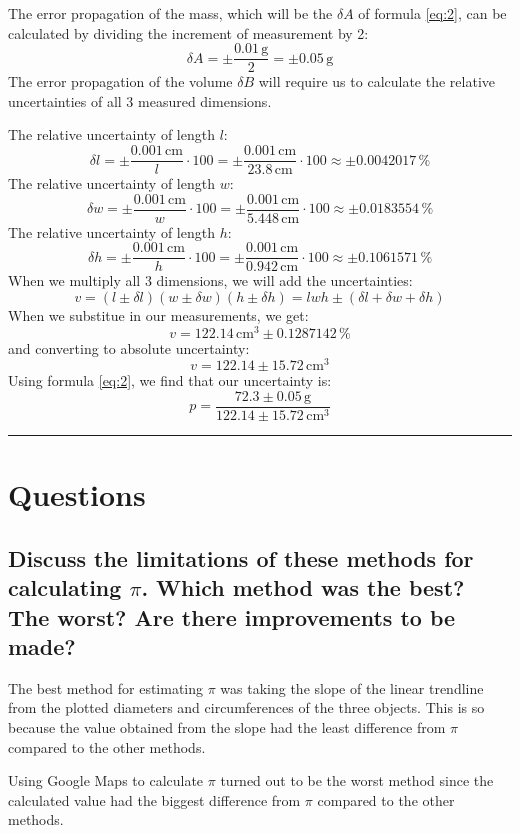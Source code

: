 \documentclass{article}
\begin{document}
The error propagation of the mass, which will be the $\delta A$ of formula \eqref{eq:2}, 
can be calculated by dividing the increment of measurement by 2:
\[ \delta A = \pm\frac{0.01\,\mathrm{g}}{2} = \pm0.05\,\mathrm{g} \]
The error propagation of the volume $\delta B$ will require us to calculate the relative uncertainties
of all 3 measured dimensions. 

\noindent The relative uncertainty of length $l$:
\[ \delta l = \pm\frac{0.001 \,\mathrm{cm}}{l} \cdot 100 = \pm\frac{0.001 \,\mathrm{cm}}{23.8 \,\mathrm{cm}} \cdot 100 \approx \pm0.0042017\,\% \]
The relative uncertainty of length $w$:
\[ \delta w = \pm\frac{0.001 \,\mathrm{cm}}{w} \cdot 100 = \pm\frac{0.001 \,\mathrm{cm}}{5.448 \,\mathrm{cm}} \cdot 100 \approx \pm0.0183554\,\% \]
The relative uncertainty of length $h$:
\[ \delta h = \pm\frac{0.001 \,\mathrm{cm}}{h} \cdot 100 = \pm\frac{0.001 \,\mathrm{cm}}{0.942 \,\mathrm{cm}} \cdot 100 \approx \pm0.1061571\,\% \]
When we multiply all 3 dimensions, we will add the uncertainties:
\[ v = (l\pm\delta l)(w\pm\delta w)(h\pm\delta h) = lwh\pm(\delta l + \delta w + \delta h) \]
When we substitue in our measurements, we get:
\[ v = 122.14 \,\mathrm{cm}^3 \pm 0.1287142\,\% \]
and converting to absolute uncertainty:
\[ v = 122.14 \pm 15.72 \,\mathrm{cm}^3 \]
Using formula \eqref{eq:2}, we find that our uncertainty is:
\[ p = \frac{72.3\pm0.05\,\mathrm{g}}{122.14\pm15.72\,\mathrm{cm}^3}\]

\vspace{1em}
\hrule

\section{Questions}
\subsection{Discuss the limitations of these 
methods for calculating $\pi$. Which method was 
the best? The worst? Are there improvements to be made?}

The best method for estimating $\pi$ was taking the slope of 
the linear trendline from the plotted diameters and circumferences 
of the three objects. This is so because the value obtained from the
slope had the least difference from $\pi$ compared to the other methods.

Using Google Maps to calculate $\pi$ turned out to be the worst method 
since the calculated value had the biggest difference from $\pi$ compared 
to the other methods.
\end{document}
